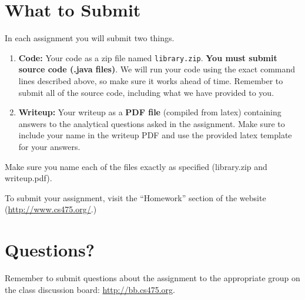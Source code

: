 \documentclass[11pt]{article}
\begin{document}
\section{What to Submit}
In each assignment you will submit two things.
\begin{enumerate}
\item {\bf Code:} Your code as a zip file named {\tt library.zip}. {\bf You must submit source code (.java files)}. We will run your code using the exact command lines described above, so make sure it works ahead of time. Remember to submit all of the source code, including what we have provided to you.
\item {\bf Writeup:} Your writeup as a {\bf PDF file} (compiled from latex) containing answers to the analytical questions asked in the assignment. Make sure to include your name in the writeup PDF and use the provided latex template for your answers.
\end{enumerate}
Make sure you name each of the files exactly as specified (library.zip and writeup.pdf).

To submit your assignment, visit the ``Homework'' section of the website (\href{http://www.cs475.org/}{http://www.cs475.org/}.)

\section{Questions?}
Remember to submit questions about the assignment to the appropriate group on the class discussion board: \href{http://bb.cs475.org/}{http://bb.cs475.org}.
\end{document}
